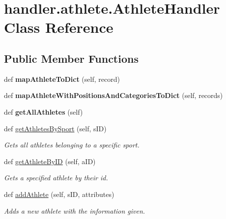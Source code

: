 \hypertarget{classhandler_1_1athlete_1_1_athlete_handler}{}\section{handler.\+athlete.\+Athlete\+Handler Class Reference}
\label{classhandler_1_1athlete_1_1_athlete_handler}
\subsection*{Public Member Functions}
\begin{DoxyCompactItemize}
\item 
\mbox{\label{classhandler_1_1athlete_1_1_athlete_handler_a953b9be16453dce8e25f08d2c53413f0}} 
def {\bfseries map\+Athlete\+To\+Dict} (self, record)
\item 
\mbox{\label{classhandler_1_1athlete_1_1_athlete_handler_a53d7b2d7abc4fe899194f146763d3287}} 
def {\bfseries map\+Athlete\+With\+Positions\+And\+Categories\+To\+Dict} (self, records)
\item 
\mbox{\label{classhandler_1_1athlete_1_1_athlete_handler_aae7ac6fee7495a16818e09a8946ead32}} 
def {\bfseries get\+All\+Athletes} (self)
\item 
def \hyperlink{classhandler_1_1athlete_1_1_athlete_handler_af33bd416854d51f10a33aa264f1e3b2f}{get\+Athletes\+By\+Sport} (self, s\+ID)
\begin{DoxyCompactList}\small\item\em Gets all athletes belonging to a specific sport. \end{DoxyCompactList}\item 
def \hyperlink{classhandler_1_1athlete_1_1_athlete_handler_a7261ed3d7231ef7bdb261863414be608}{get\+Athlete\+By\+ID} (self, a\+ID)
\begin{DoxyCompactList}\small\item\em Gets a specified athlete by their id. \end{DoxyCompactList}\item 
def \hyperlink{classhandler_1_1athlete_1_1_athlete_handler_a08fe0c2dab373f26b69dbab68a1b2a72}{add\+Athlete} (self, s\+ID, attributes)
\begin{DoxyCompactList}\small\item\em Adds a new athlete with the information given. \end{DoxyCompactList}\item 

\end{DoxyCompactItemize}

